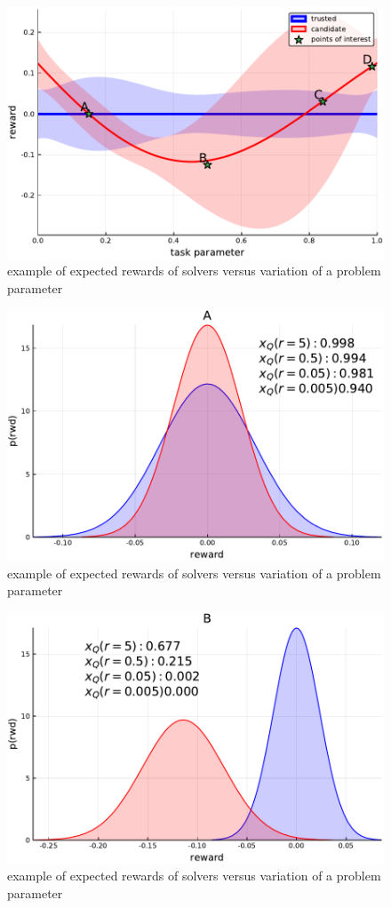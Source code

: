 \begin{figure}[tbp]
    \centering
    \includegraphics[width=0.9\linewidth]{Figures/p1}
    \caption{example of expected rewards of solvers versus variation of a problem parameter}
    \label{fig:sq_thry1}
\end{figure}
\begin{figure}[tbp]
    \centering
    \includegraphics[width=0.9\linewidth]{Figures/p2}
    \caption{example of expected rewards of solvers versus variation of a problem parameter}
    \label{fig:sq_thry2}
\end{figure}
\begin{figure}[tbp]
    \centering
    \includegraphics[width=0.9\linewidth]{Figures/p3}
    \caption{example of expected rewards of solvers versus variation of a problem parameter}
    \label{fig:sq_thry3}
\end{figure}
